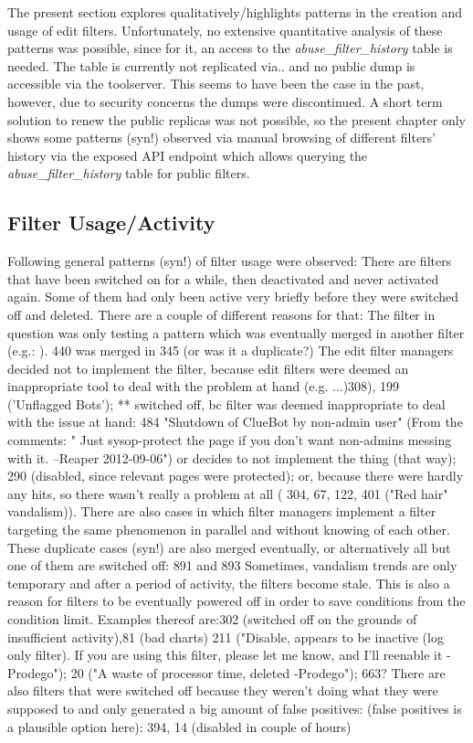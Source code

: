 The present section explores qualitatively/highlights patterns in the creation and usage of edit filters.
Unfortunately, no extensive quantitative analysis of these patterns was possible, since for it, an access to the \emph{abuse\_filter\_history} table is needed.
The table is currently not replicated via.. and no public dump is accessible via the toolserver. %
This seems to have been the case in the past, however, due to security concerns the dumps were discontinued. %
A short term solution to renew the public replicas was not possible, so the present chapter only shows some patterns (syn!) observed via manual browsing of different filters' history via the exposed API endpoint which allows querying the \emph{abuse\_filter\_history} table for public filters.

\subsection{Filter Usage/Activity}

Following general patterns (syn!) of filter usage were observed:
There are filters that have been switched on for a while, then deactivated and never activated again.
Some of them had only been active very briefly before they were switched off and deleted.
There are a couple of different reasons for that:
The filter in question was only testing a pattern which was eventually merged in another filter (e.g.: ). 440 was merged in 345 (or was it a duplicate?)
The edit filter managers decided not to implement the filter, because edit filters were deemed an inappropriate tool to deal with the problem at hand (e.g. ...)308), 199 ('Unflagged Bots');
  ** switched off, bc filter was deemed inappropriate to deal with the issue at hand: 484 "Shutdown of ClueBot by non-admin user" (From the comments: " Just sysop-protect the page if you don't want non-admins messing with it. --Reaper 2012-09-06")
or decides to not implement the thing (that way); 290 (disabled, since relevant pages were protected);
or, because there were hardly any hits, so there wasn't really a problem at all ( 304, 67, 122, 401 ("Red hair" vandalism)). %
There are also cases in which filter managers implement a filter targeting the same phenomenon in parallel and without knowing of each other.
These duplicate cases (syn!) are also merged eventually, or alternatively all but one of them are switched off: 891 and 893
Sometimes, vandalism trends are only temporary and after a period of activity, the filters become stale.
This is also a reason for filters to be eventually powered off in order to save conditions from the condition limit.
Examples thereof are:302 (switched off on the grounds of insufficient activity),81 (bad charts)
 211 ("Disable, appears to be inactive (log only filter). If you are using this filter, please let me know, and I'll reenable it -Prodego"); 20 ("A waste of processor time, deleted -Prodego"); 663?
There are also filters that were switched off because they weren't doing what they were supposed to and only generated a big amount of false positives: (false positives is a plausible option here): 394,  14 (disabled in couple of hours)

